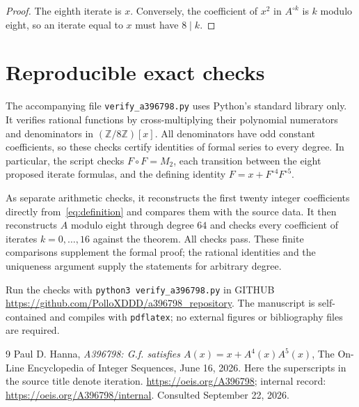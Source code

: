 \documentclass[11pt]{article}
\theoremstyle{remark}
\newcommand{\Z}{\mathbb Z}
\newcommand{\itn}[2]{{#1}^{\circ #2}}
\begin{document}
\begin{proof}
The eighth iterate is $x$. Conversely, the coefficient of $x^2$ in
$\itn{A}{k}$ is $k$ modulo eight, so an iterate equal to $x$ must
have $8\mid k$.
\end{proof}

\section{Reproducible exact checks}

The accompanying file \texttt{verify\_a396798.py} uses Python's standard
library only. It verifies rational functions by cross-multiplying their
polynomial numerators and denominators in $(\Z/8\Z)[x]$. All denominators
have odd constant coefficients, so these checks certify identities of
formal series to every degree. In particular, the script checks
$F\circ F=M_2$, each transition between the eight proposed iterate
formulas, and the defining identity $F=x+\itn{F}{4}\itn{F}{5}$.

As separate arithmetic checks, it reconstructs the first twenty integer
coefficients directly from~\eqref{eq:definition} and compares them with
the source data. It then reconstructs $A$ modulo eight through degree
$64$ and checks every coefficient of iterates $k=0,\ldots,16$ against
the theorem. All checks pass. These finite comparisons supplement the
formal proof; the rational identities and the uniqueness argument supply
the statements for arbitrary degree.

Run the checks with \texttt{python3 verify\_a396798.py} in GITHUB \url{https://github.com/PolloXDDD/a396798_repository}. The manuscript
is self-contained and compiles with \texttt{pdflatex}; no external
figures or bibliography files are required.


\begin{thebibliography}{9}
Paul D. Hanna,
\emph{A396798: G.f. satisfies $A(x)=x+A^4(x)A^5(x)$},
The On-Line Encyclopedia of Integer Sequences, June 16, 2026.
Here the superscripts in the source title denote iteration.
\url{https://oeis.org/A396798}; internal record:
\url{https://oeis.org/A396798/internal}.
Consulted September 22, 2026.
\end{thebibliography}
\end{document}
